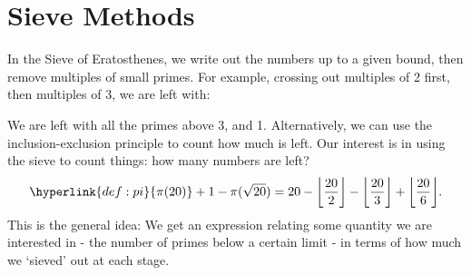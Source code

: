 \documentclass{article}
\DeclarePairedDelimiter\floor{\lfloor}{\rfloor}
\begin{document}
\clearpage
\section{Sieve Methods}
\newlec
In the Sieve of Eratosthenes, we write out the numbers up to a given bound, then remove multiples of small primes. For example, crossing out multiples of 2 first, then multiples of 3, we are left with:
\begin{center}
\end{center}
We are left with all the primes above 3, and 1. Alternatively, we can use the inclusion-exclusion principle to count how much is left.
Our interest is in using the sieve to count things: how many numbers are left?
\begin{align*}
  \hyperlink{def:pi}{\pi(20)} + 1 - \pi(\sqrt{20}) = 20 - \floor*{\frac{20}{2}} - \floor*{\frac{20}{3}} + \floor*{\frac{20}{6}}.
\end{align*}
This is the general idea: We get an expression relating some quantity we are interested in - the number of primes below a certain limit - in terms of how much we `sieved' out at each stage.
\end{document}
